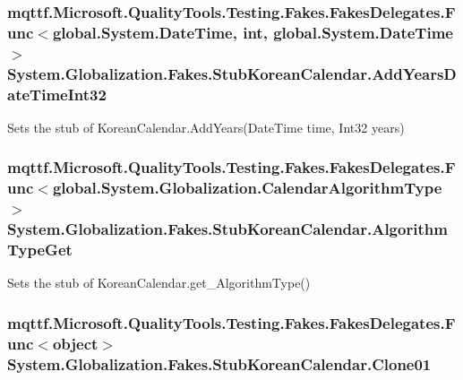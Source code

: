 \hypertarget{class_system_1_1_globalization_1_1_fakes_1_1_stub_korean_calendar_a32e85b4056586dfd8fbccdaa698d970c}{
\subsubsection[{Add\-Years\-Date\-Time\-Int32}]{\setlength{\rightskip}{0pt plus 5cm}mqttf.\-Microsoft.\-Quality\-Tools.\-Testing.\-Fakes.\-Fakes\-Delegates.\-Func$<$global.\-System.\-Date\-Time, int, global.\-System.\-Date\-Time$>$ System.\-Globalization.\-Fakes.\-Stub\-Korean\-Calendar.\-Add\-Years\-Date\-Time\-Int32}}\label{class_system_1_1_globalization_1_1_fakes_1_1_stub_korean_calendar_a32e85b4056586dfd8fbccdaa698d970c}


Sets the stub of Korean\-Calendar.\-Add\-Years(\-Date\-Time time, Int32 years)

\hypertarget{class_system_1_1_globalization_1_1_fakes_1_1_stub_korean_calendar_a870400badf5d956d6b2d2ab63423d3ce}{
\subsubsection[{Algorithm\-Type\-Get}]{\setlength{\rightskip}{0pt plus 5cm}mqttf.\-Microsoft.\-Quality\-Tools.\-Testing.\-Fakes.\-Fakes\-Delegates.\-Func$<$global.\-System.\-Globalization.\-Calendar\-Algorithm\-Type$>$ System.\-Globalization.\-Fakes.\-Stub\-Korean\-Calendar.\-Algorithm\-Type\-Get}}\label{class_system_1_1_globalization_1_1_fakes_1_1_stub_korean_calendar_a870400badf5d956d6b2d2ab63423d3ce}


Sets the stub of Korean\-Calendar.\-get\-\_\-\-Algorithm\-Type()

\hypertarget{class_system_1_1_globalization_1_1_fakes_1_1_stub_korean_calendar_a6f9e65fe1c890d7d81ea4fb81b5dcfcf}{
\subsubsection[{Clone01}]{\setlength{\rightskip}{0pt plus 5cm}mqttf.\-Microsoft.\-Quality\-Tools.\-Testing.\-Fakes.\-Fakes\-Delegates.\-Func$<$object$>$ System.\-Globalization.\-Fakes.\-Stub\-Korean\-Calendar.\-Clone01}}\label{class_system_1_1_globalization_1_1_fakes_1_1_stub_korean_calendar_a6f9e65fe1c890d7d81ea4fb81b5dcfcf}


